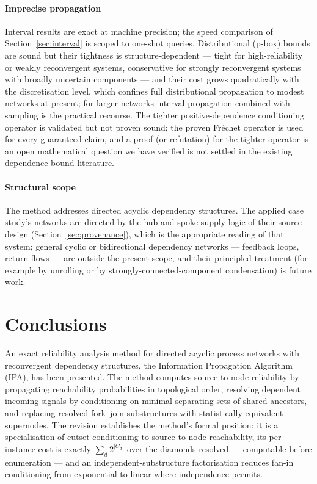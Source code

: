 \documentclass[preprint,12pt]{elsarticle}
\theoremstyle{definition}
\begin{document}
\paragraph{Imprecise propagation} Interval results are exact at machine precision; the speed comparison
of Section~\ref{sec:interval} is scoped to one-shot queries. Distributional (p-box) bounds are sound but
their tightness is structure-dependent --- tight for high-reliability or weakly reconvergent systems,
conservative for strongly reconvergent systems with broadly uncertain components --- and their cost
grows quadratically with the discretisation level, which confines full distributional propagation to
modest networks at present; for larger networks interval propagation combined with sampling is the
practical recourse. The tighter positive-dependence conditioning operator is validated but not proven
sound; the proven Fr\'echet operator is used for every guaranteed claim, and a proof (or refutation) for
the tighter operator is an open mathematical question we have verified is not settled in the existing
dependence-bound literature.

\paragraph{Structural scope} The method addresses directed acyclic dependency structures. The applied
case study's networks are directed by the hub-and-spoke supply logic of their source design
(Section~\ref{sec:provenance}), which is the appropriate reading of that system; general cyclic or
bidirectional dependency networks --- feedback loops, return flows --- are outside the present scope,
and their principled treatment (for example by unrolling or by strongly-connected-component
condensation) is future work.

\section{Conclusions}\label{sec:conclusions}

An exact reliability analysis method for directed acyclic process networks with reconvergent dependency
structures, the Information Propagation Algorithm (IPA), has been presented. The method computes
source-to-node reliability by propagating reachability probabilities in topological order, resolving
dependent incoming signals by conditioning on minimal separating sets of shared ancestors, and replacing
resolved fork--join substructures with statistically equivalent supernodes. The revision establishes the
method's formal position: it is a specialisation of cutset conditioning to source-to-node reachability,
its per-instance cost is exactly $\sum_d 2^{|C_d|}$ over the diamonds resolved --- computable before
enumeration --- and an independent-substructure factorisation reduces fan-in conditioning from
exponential to linear where independence permits.
\end{document}
